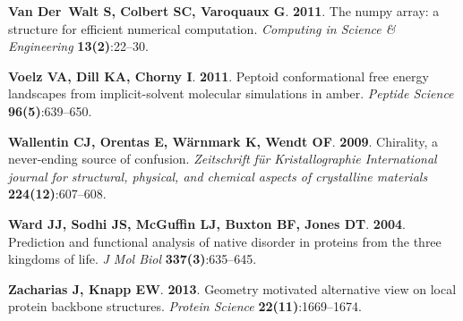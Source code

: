 \documentclass[fleqn,10pt,lineno]{wlpeerj} %
\begin{document}
\begin{thebibliography}{58}
\textbf{Van Der~Walt S, Colbert SC, Varoquaux G}. \textbf{2011}.
\newblock The numpy array: a structure for efficient numerical computation.
\newblock \emph{Computing in Science \& Engineering} \textbf{13(2)}:22--30.

\textbf{Voelz VA, Dill KA, Chorny I}. \textbf{2011}.
\newblock Peptoid conformational free energy landscapes from implicit-solvent
  molecular simulations in amber.
\newblock \emph{Peptide Science} \textbf{96(5)}:639--650.

\textbf{Wallentin CJ, Orentas E, W{\"a}rnmark K, Wendt OF}. \textbf{2009}.
\newblock Chirality, a never-ending source of confusion.
\newblock \emph{Zeitschrift f{\"u}r Kristallographie International journal for
  structural, physical, and chemical aspects of crystalline materials}
  \textbf{224(12)}:607--608.

\textbf{Ward JJ, Sodhi JS, McGuffin LJ, Buxton BF, Jones DT}. \textbf{2004}.
\newblock Prediction and functional analysis of native disorder in proteins
  from the three kingdoms of life.
\newblock \emph{J Mol Biol} \textbf{337(3)}:635--645.

\textbf{Zacharias J, Knapp EW}. \textbf{2013}.
\newblock Geometry motivated alternative view on local protein backbone
  structures.
\newblock \emph{Protein Science} \textbf{22(11)}:1669--1674.

\end{thebibliography}
\end{document}
